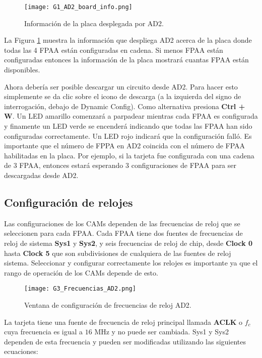 \begin{figure}[hbtp]
\caption{Información de la placa desplegada por AD2.}
\label{fig:G1_AD2_board_info.png}
\centering
\texttt{[image: G1\_AD2\_board\_info.png]}
\end{figure}
	
	La Figura \ref{fig:G1_AD2_board_info.png} muestra la información que despliega AD2 acerca de la placa donde todas las 4 FPAA están configuradas en cadena. Si menos FPAA están configuradas entonces la información de la placa mostrará cuantas FPAA están disponibles.

Ahora debería ser posible descargar un circuito desde AD2. Para hacer esto simplemente se da clic sobre el icono de descarga (a la izquierda del signo de interrogación, debajo de Dynamic Config). Como alternativa presiona \textbf{Ctrl + W}. Un LED amarillo comenzará a parpadear mientras cada FPAA es configurada y finamente un LED verde se encenderá indicando que todas las FPAA han sido configuradas correctamente. Un LED rojo indicará que la configuración falló. Es importante que el número de FPPA en AD2 coincida con el número de FPAA habilitadas en la placa. Por ejemplo, si la tarjeta fue configurada con una cadena de 3 FPAA, entonces estará esperando 3 configuraciones de FPAA para ser descargadas desde AD2.
	
	
	\subsection{Configuración de relojes}
	
	Las configuraciones de los CAMs dependen de las frecuencias de reloj que se seleccionen para cada FPAA. Cada FPAA tiene dos fuentes de frecuencias de reloj de sistema \textbf{Sys1} y \textbf{Sys2}, y seis frecuencias de reloj de chip, desde \textbf{Clock 0} hasta \textbf{Clock 5} que son subdivisiones de cualquiera de las fuentes de reloj sistema. Seleccionar y configurar correctamente los relojes es importante ya que el rango de operación de los CAMs depende de esto. 
	
\begin{figure}[!hbp] 
\caption{Ventana de configuración de frecuencias de reloj AD2.}
\label{fig:G3_Frecuencias_AD2.png}
\centering
\texttt{[image: G3\_Frecuencias\_AD2.png]}
\end{figure}

La tarjeta tiene una fuente de frecuencia de reloj principal llamada \textbf{ACLK} o $f_{c}$ cuya frecuencia es igual a $16$ MHz y no puede ser cambiada. Sys1 y Sys2 dependen de esta frecuencia y pueden ser modificadas utilizando las siguientes ecuaciones:

